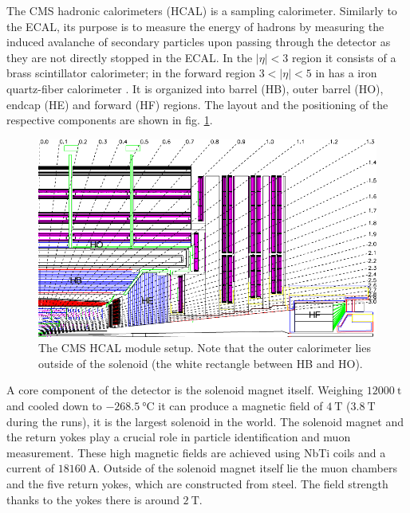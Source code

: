 

The CMS hadronic calorimeters (HCAL) is a sampling calorimeter. Similarly to the ECAL, its purpose is to measure the energy of hadrons by measuring the induced avalanche of secondary particles upon passing through the detector as they are not directly stopped in the ECAL. In the $|\eta|<3$ region it consists of a brass scintillator calorimeter; in the forward region $3<|\eta|<5$ in has a iron quartz-fiber calorimeter \cite{canko_ak_2009}. It is organized into barrel (HB), outer barrel (HO), endcap (HE) and forward (HF) regions. The layout and the positioning of the respective components are shown in fig. \ref{fig:hcal}.

\begin{figure}[h!]
	\centering
	\includegraphics[width=0.8\linewidth]{figures/theoryexperiment/hcal.pdf}
	\caption{The CMS HCAL module setup. Note that the outer calorimeter lies outside of the solenoid (the white rectangle between HB and HO). \cite{Chatrchyan:1129810}}
	\label{fig:hcal}
\end{figure}


A core component of the detector is the solenoid magnet itself. Weighing $\SI{12000}{\tonne}$ and cooled down to $\SI{-268.5}{\degreeCelsius}$ it can produce a magnetic field of $\SI{4}{\tesla}$ ($\SI{3.8}{\tesla}$ during the runs), it is the largest solenoid in the world. The solenoid magnet and the return yokes play a crucial role in particle identification and muon measurement. These high magnetic fields are achieved using NbTi coils and a current of $\SI{18160}{\ampere}$. Outside of the solenoid magnet itself lie the muon chambers and the five return yokes, which are constructed from steel. The field strength thanks to the yokes there is around $\SI{2}{\tesla}$.


